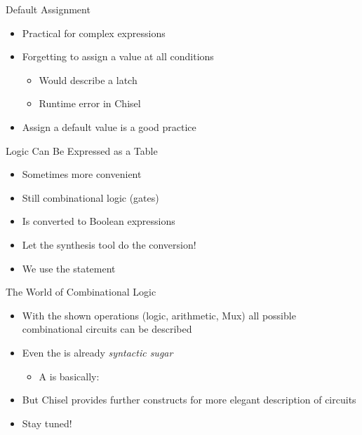 \begin{frame}[fragile]{Default Assignment}
\begin{itemize}
\item Practical for complex expressions
\item Forgetting to assign a value at all conditions
\begin{itemize}
\item Would describe a latch
\item Runtime error in Chisel
\end{itemize}
\item Assign a default value is a good practice
\end{itemize}
\end{frame}

\begin{frame}[fragile]{Logic Can Be Expressed as a Table}
\begin{itemize}
\item Sometimes more convenient 
\item Still combinational logic (gates)
\item Is converted to Boolean expressions
\item Let the synthesis tool do the conversion!
\item We use the  statement
\end{itemize}
\end{frame}



\begin{frame}[fragile]{The World of Combinational Logic}
\begin{itemize}
\item With the shown operations (logic, arithmetic, Mux) all possible combinational circuits can be described
\item Even the  is already \emph{syntactic sugar}
\begin{itemize}
\item A  is basically: 
\end{itemize}
\item But Chisel provides further constructs for more elegant description of circuits
\item Stay tuned!
\end{itemize}
\end{frame}


